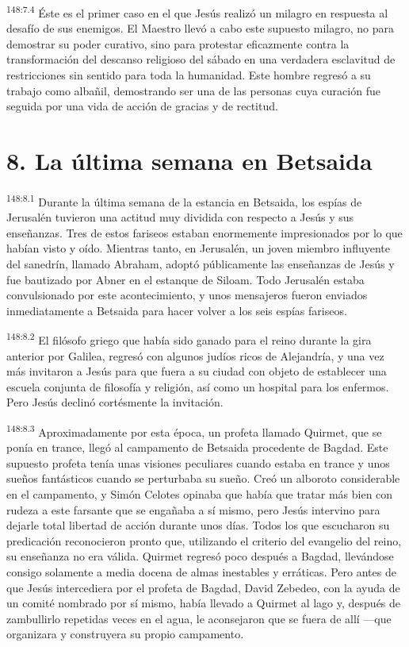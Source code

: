 \par 
\textsuperscript{148:7.4} Éste es el primer caso en el que Jesús realizó un milagro en respuesta al desafío de sus enemigos. El Maestro llevó a cabo este supuesto milagro, no para demostrar su poder curativo, sino para protestar eficazmente contra la transformación del descanso religioso del sábado en una verdadera esclavitud de restricciones sin sentido para toda la humanidad. Este hombre regresó a su trabajo como albañil, demostrando ser una de las personas cuya curación fue seguida por una vida de acción de gracias y de rectitud.

\section*{8. La última semana en Betsaida}
\par 
\textsuperscript{148:8.1} Durante la última semana de la estancia en Betsaida, los espías de Jerusalén tuvieron una actitud muy dividida con respecto a Jesús y sus enseñanzas. Tres de estos fariseos estaban enormemente impresionados por lo que habían visto y oído. Mientras tanto, en Jerusalén, un joven miembro influyente del sanedrín, llamado Abraham, adoptó públicamente las enseñanzas de Jesús y fue bautizado por Abner en el estanque de Siloam. Todo Jerusalén estaba convulsionado por este acontecimiento, y unos mensajeros fueron enviados inmediatamente a Betsaida para hacer volver a los seis espías fariseos.

\par 
\textsuperscript{148:8.2} El filósofo griego que había sido ganado para el reino durante la gira anterior por Galilea, regresó con algunos judíos ricos de Alejandría, y una vez más invitaron a Jesús para que fuera a su ciudad con objeto de establecer una escuela conjunta de filosofía y religión, así como un hospital para los enfermos. Pero Jesús declinó cortésmente la invitación.

\par 
\textsuperscript{148:8.3} Aproximadamente por esta época, un profeta llamado Quirmet, que se ponía en trance, llegó al campamento de Betsaida procedente de Bagdad. Este supuesto profeta tenía unas visiones peculiares cuando estaba en trance y unos sueños fantásticos cuando se perturbaba su sueño. Creó un alboroto considerable en el campamento, y Simón Celotes opinaba que había que tratar más bien con rudeza a este farsante que se engañaba a sí mismo, pero Jesús intervino para dejarle total libertad de acción durante unos días. Todos los que escucharon su predicación reconocieron pronto que, utilizando el criterio del evangelio del reino, su enseñanza no era válida. Quirmet regresó poco después a Bagdad, llevándose consigo solamente a media docena de almas inestables y erráticas. Pero antes de que Jesús intercediera por el profeta de Bagdad, David Zebedeo, con la ayuda de un comité nombrado por sí mismo, había llevado a Quirmet al lago y, después de zambullirlo repetidas veces en el agua, le aconsejaron que se fuera de allí ---que organizara y construyera su propio campamento.


